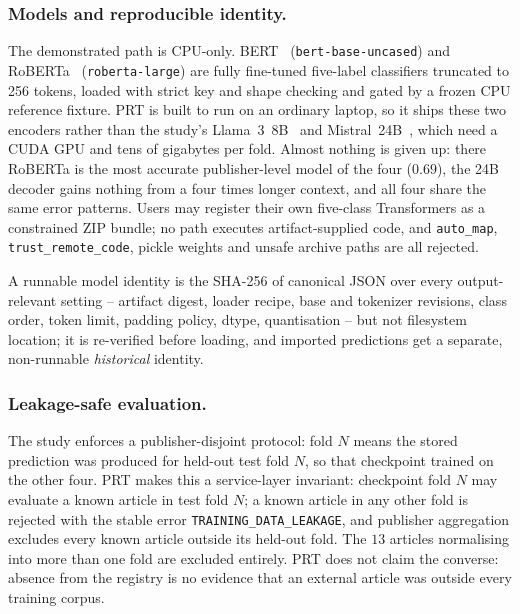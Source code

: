 \documentclass[runningheads]{llncs}
\begin{document}
\subsubsection{Models and reproducible identity.}
The demonstrated path is CPU-only. BERT~\cite{devlin2019bert}
(\texttt{bert-base-uncased}) and RoBERTa~\cite{liu2020roberta}
(\texttt{roberta-large}) are fully fine-tuned five-label classifiers truncated
to 256 tokens, loaded with strict key and shape checking and gated by a frozen
CPU reference fixture. PRT is built to run on an ordinary laptop, so it ships
these two encoders rather than the study's Llama~3~8B~\cite{llama2024herd} and
Mistral~24B~\cite{jiang2024mixtral}, which need a CUDA GPU and tens of gigabytes
per fold. Almost nothing is given up: there RoBERTa is the most accurate
publisher-level model of the four ($0.69$), the 24B decoder gains nothing from a
four times longer context, and all four share the same error patterns.
Users may register their own five-class Transformers as a constrained ZIP
bundle; no path executes artifact-supplied code, and \texttt{auto\_map},
\texttt{trust\_remote\_code}, pickle weights and unsafe archive paths are all
rejected.

A runnable model identity is the SHA-256 of canonical JSON over every
output-relevant setting -- artifact digest, loader recipe, base and tokenizer
revisions, class order, token limit, padding policy, dtype, quantisation -- but
not filesystem location; it is re-verified before loading, and imported
predictions get a separate, non-runnable \emph{historical} identity.

\subsubsection{Leakage-safe evaluation.}
The study enforces a publisher-disjoint protocol: fold $N$ means the stored
prediction was produced for held-out test fold $N$, so that checkpoint trained
on the other four. PRT makes this a service-layer invariant: checkpoint fold
$N$ may evaluate a known article in test fold $N$; a known article in any other
fold is rejected with the stable error
\texttt{TRAINING\_DATA\_LEAKAGE}, and publisher aggregation excludes every known
article outside its held-out fold. The $13$ articles normalising into more than one fold are excluded
entirely. PRT does not claim the converse: absence from the registry
is no evidence that an external article was outside every training corpus.
\end{document}
